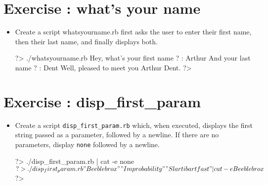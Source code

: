 \documentclass{42-en}
\begin{document}
\chapter{Exercise \exercicenumber: what's your name}

\exnumber{\exercicenumber}

\makeheaderfiles

\begin{itemize}

\item Create a script whatsyourname.rb first asks the user to enter their first name, then their last name, and finally displays both.

\begin{42console}
	?> ./whatsyourname.rb
	Hey, what's your first name ? : Arthur
	And your last name ? : Dent
	Well, pleased to meet you Arthur Dent.
	?>
\end{42console}

\end{itemize}




\chapter{Exercise \exercicenumber: disp\_first\_param}

\exnumber{\exercicenumber}

\makeheaderfiles

\begin{itemize}

\item Create a script \texttt{disp\_first\_param.rb} which, when executed, displays the first string passed as a parameter, followed by a newline. If there are no parameters, display \texttt{none} followed by a newline. 

\begin{42console}
	?> ./disp_first_param.rb | cat -e
	none$
	?> ./disp_first_param.rb "Beeblebrox" "Improbability" "Slartibartfast" | cat -e
	Beeblebrox$
	?>
\end{42console}

\end{itemize}
\end{document}

